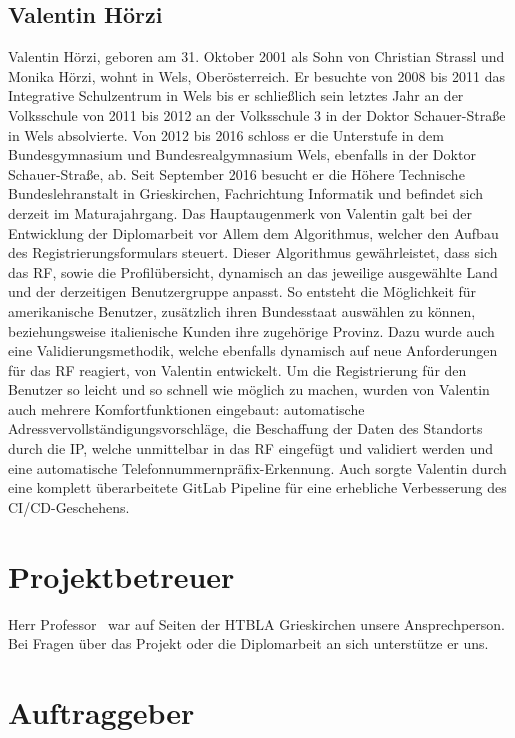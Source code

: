 \subsection{Valentin Hörzi}
Valentin Hörzi, geboren am 31. Oktober 2001 als Sohn von Christian Strassl und Monika Hörzi, wohnt in Wels, Oberösterreich. Er besuchte von 2008 bis 2011 das Integrative Schulzentrum in Wels bis er schließlich sein letztes Jahr an der Volksschule von 2011 bis 2012 an der Volksschule 3 in der Doktor Schauer-Straße in Wels absolvierte. Von 2012 bis 2016 schloss er die Unterstufe in dem Bundesgymnasium und Bundesrealgymnasium Wels, ebenfalls in der Doktor Schauer-Straße, ab. Seit September 2016 besucht er die Höhere Technische  Bundeslehranstalt in Grieskirchen, Fachrichtung Informatik und befindet sich derzeit im Maturajahrgang. Das Hauptaugenmerk von Valentin galt bei der Entwicklung der Diplomarbeit vor Allem dem Algorithmus, welcher den Aufbau des Registrierungsformulars steuert.
Dieser Algorithmus gewährleistet, dass sich das RF, sowie die Profilübersicht, dynamisch an das jeweilige ausgewählte Land und der derzeitigen Benutzergruppe anpasst. So entsteht die Möglichkeit für amerikanische Benutzer, zusätzlich ihren Bundesstaat auswählen zu können, beziehungsweise italienische Kunden ihre zugehörige Provinz. Dazu wurde auch eine Validierungsmethodik, welche ebenfalls dynamisch auf neue Anforderungen für das RF reagiert, von Valentin entwickelt. Um die Registrierung für den Benutzer so leicht und so schnell wie möglich zu machen, wurden von Valentin auch mehrere Komfortfunktionen eingebaut: automatische Adressvervollständigungsvorschläge, die Beschaffung der Daten des Standorts durch die IP, welche unmittelbar in das RF eingefügt und validiert werden und eine automatische Telefonnummernpräfix-Erkennung.
Auch sorgte Valentin durch eine komplett überarbeitete GitLab Pipeline für eine erhebliche Verbesserung des CI/CD-Geschehens.

\section{Projektbetreuer}

Herr Professor \ThSupervisorName \, war auf Seiten der HTBLA Grieskirchen unsere Ansprechperson. Bei Fragen über das Projekt oder die Diplomarbeit an sich unterstütze er uns.

\section{Auftraggeber}

